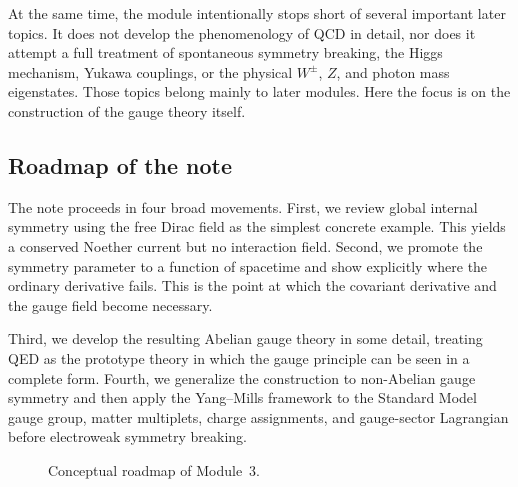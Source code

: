 \documentclass[11pt,a4paper]{article}
\begin{document}
At the same time, the module intentionally stops short of several important later topics. It does not develop the phenomenology of QCD in detail, nor does it attempt a full treatment of spontaneous symmetry breaking, the Higgs mechanism, Yukawa couplings, or the physical \(W^\pm\), \(Z\), and photon mass eigenstates. Those topics belong mainly to later modules. Here the focus is on the construction of the gauge theory itself.




\subsection{Roadmap of the note}

The note proceeds in four broad movements. First, we review global internal symmetry using the free Dirac field as the simplest concrete example. This yields a conserved Noether current but no interaction field. Second, we promote the symmetry parameter to a function of spacetime and show explicitly where the ordinary derivative fails. This is the point at which the covariant derivative and the gauge field become necessary.

Third, we develop the resulting Abelian gauge theory in some detail, treating QED as the prototype theory in which the gauge principle can be seen in a complete form. Fourth, we generalize the construction to non-Abelian gauge symmetry and then apply the Yang--Mills framework to the Standard Model gauge group, matter multiplets, charge assignments, and gauge-sector Lagrangian before electroweak symmetry breaking.

\begin{figure}[H]
\centering
{}
\caption{Conceptual roadmap of Module~3.}
\label{fig:module3-roadmap}
\end{figure}
\end{document}
